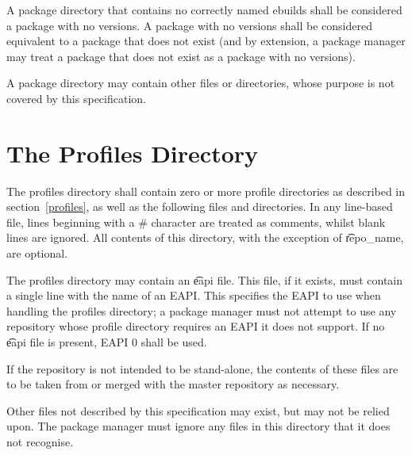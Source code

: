 A package directory that contains no correctly named ebuilds shall be considered a package with no
versions. A package with no versions shall be considered equivalent to a package that does not
exist (and by extension, a package manager may treat a package that does not exist as a package
with no versions).

A package directory may contain other files or directories, whose purpose is not covered by
this specification.

\section{The Profiles Directory}
\label{profiles-dir}

The profiles directory shall contain zero or more profile directories
as described in section~\ref{profiles}, as well as the following files
and directories. In any line-based file, lines beginning with a \#
character are treated as comments, whilst blank lines are ignored. All
contents of this directory, with the exception of \t{repo\_name}, are
optional.

The profiles directory may contain an \t{eapi} file. This file, if it exists, must contain a single
line with the name of an EAPI. This specifies the EAPI to use when handling the profiles directory;
a package manager must not attempt to use any repository whose profile directory requires an EAPI it
does not support. If no \t{eapi} file is present, EAPI 0 shall be used.

If the repository is not intended to be stand-alone, the contents of these files are to be taken
from or merged with the master repository as necessary.

Other files not described by this specification may exist, but may not be relied upon. The package
manager must ignore any files in this directory that it does not recognise.

